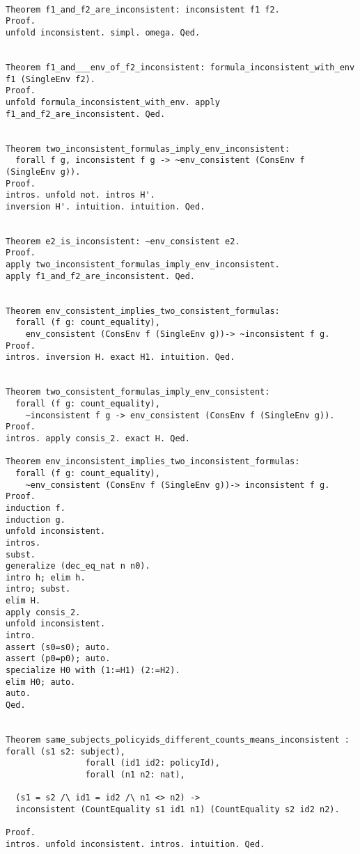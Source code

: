 \lstset{language=Coq}
\begin{lstlisting}[frame=single, caption={Inconsistent Environment}, label={lst:inconsistenttheorems}]

Theorem f1_and_f2_are_inconsistent: inconsistent f1 f2.
Proof. 
unfold inconsistent. simpl. omega. Qed.


Theorem f1_and___env_of_f2_inconsistent: formula_inconsistent_with_env f1 (SingleEnv f2).
Proof. 
unfold formula_inconsistent_with_env. apply f1_and_f2_are_inconsistent. Qed.


Theorem two_inconsistent_formulas_imply_env_inconsistent: 
  forall f g, inconsistent f g -> ~env_consistent (ConsEnv f (SingleEnv g)).
Proof. 
intros. unfold not. intros H'. 
inversion H'. intuition. intuition. Qed.


Theorem e2_is_inconsistent: ~env_consistent e2.
Proof.
apply two_inconsistent_formulas_imply_env_inconsistent. 
apply f1_and_f2_are_inconsistent. Qed.


Theorem env_consistent_implies_two_consistent_formulas: 
  forall (f g: count_equality), 
    env_consistent (ConsEnv f (SingleEnv g))-> ~inconsistent f g.
Proof. 
intros. inversion H. exact H1. intuition. Qed.


Theorem two_consistent_formulas_imply_env_consistent: 
  forall (f g: count_equality), 
    ~inconsistent f g -> env_consistent (ConsEnv f (SingleEnv g)).
Proof. 
intros. apply consis_2. exact H. Qed.

Theorem env_inconsistent_implies_two_inconsistent_formulas: 
  forall (f g: count_equality), 
    ~env_consistent (ConsEnv f (SingleEnv g))-> inconsistent f g.
Proof.
induction f.
induction g.
unfold inconsistent.
intros.
subst.
generalize (dec_eq_nat n n0).
intro h; elim h.
intro; subst.
elim H.
apply consis_2.
unfold inconsistent.
intro.
assert (s0=s0); auto.
assert (p0=p0); auto.
specialize H0 with (1:=H1) (2:=H2).
elim H0; auto.
auto.
Qed.


Theorem same_subjects_policyids_different_counts_means_inconsistent : forall (s1 s2: subject),
                forall (id1 id2: policyId),
                forall (n1 n2: nat),

  (s1 = s2 /\ id1 = id2 /\ n1 <> n2) -> 
  inconsistent (CountEquality s1 id1 n1) (CountEquality s2 id2 n2).

Proof. 
intros. unfold inconsistent. intros. intuition. Qed.



\end{lstlisting}
















